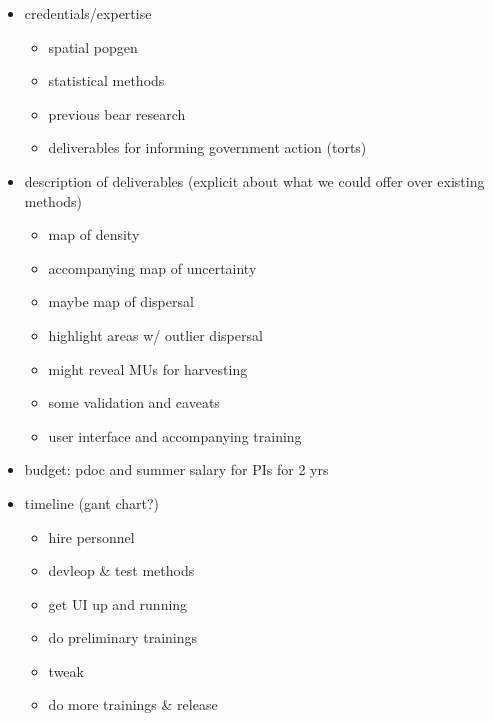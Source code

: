\documentclass[12pt]{article}
\begin{document}
\begin{itemize}
\item credentials/expertise 
\begin{itemize}
\item spatial popgen
\item statistical methods
\item previous bear research
\item deliverables for informing government action (torts)
\end{itemize}
\item description of deliverables (explicit about what we could offer over existing methods)
\begin{itemize}
\item map of density
\item accompanying map of uncertainty
\item maybe map of dispersal
\item highlight areas w/ outlier dispersal
\item might reveal MUs for harvesting
\item some validation and caveats
\item user interface and accompanying training 
\end{itemize}
\item budget: pdoc and summer salary for PIs for 2 yrs
\item timeline (gant chart?)
\begin{itemize}
\item hire personnel
\item devleop \& test methods
\item get UI up and running
\item do preliminary trainings
\item tweak
\item do more trainings \& release
\end{itemize}
\end{itemize}

\clearpage
%
\end{document}
